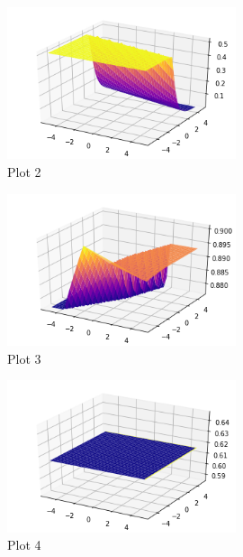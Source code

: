 \documentclass[a4paper]{article}
\theoremstyle{definition}
\newenvironment{soln}{
    \leavevmode\color{blue}\ignorespaces
}{}
\begin{document}
\begin{enumerate}
\begin{soln}
\begin{figure}[h!]
	        \centering
	        \includegraphics[width=0.6\textwidth]{Q4/Img2.png} 
	        \captionsetup{labelformat=empty}
	        \caption{Plot 2}
\end{figure}


\begin{figure}[h!]
	        \centering
	        \includegraphics[width=0.6\textwidth]{Q4/Img3.png} 
	        \captionsetup{labelformat=empty}
	        \caption{Plot 3}
\end{figure}

\begin{figure}[h!]
	        \centering
	        \includegraphics[width=0.6\textwidth]{Q4/Img4.png} 
	        \captionsetup{labelformat=empty}
	        \caption{Plot 4}
\end{figure}


\end{soln}
\end{enumerate}
\end{document}

